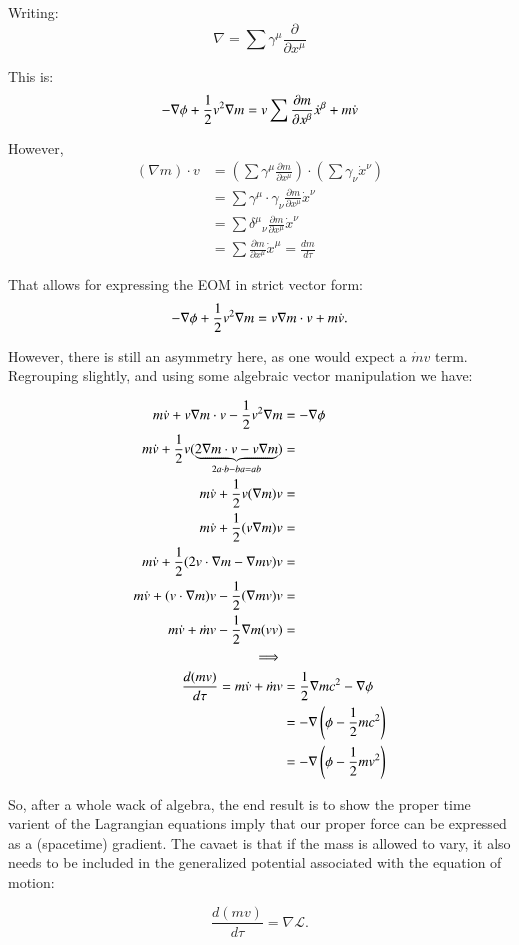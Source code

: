 \documentclass{article}      %
\newcommand{\LL}[0]{\mathcal{L}}
\newcommand{\grad}[0]{\nabla}
\newcommand{\PD}[2]{\frac{\partial {#2}}{\partial {#1}}}
\newcommand{\xdot}[0]{\dot{x}}
\newcommand{\vdot}[0]{\dot{v}}
\newcommand{\mdot}[0]{\dot{m}}
\begin{document}
Writing:
\begin{equation*}
\nabla = \sum \gamma^{\mu} \frac{\partial}{\partial x^{\mu}}
\end{equation*}

This is:
\begin{equation*}
- \grad \phi + \inv{2} v^2 \grad m = v \sum \PD{x^{\beta}}{m} \xdot^{\beta} + m \vdot 
\end{equation*}

However, 
\begin{align*}
(\grad m) \cdot v 
&= 
\left(\sum \gamma^{\mu} \PD{x^{\mu}}{m}\right) \cdot \left( \sum \gamma_{\nu} \xdot^{\nu} \right) \\
&= \sum \gamma^{\mu} \cdot \gamma_{\nu} \PD{x^{\mu}}{m} \xdot^{\nu} \\
&= \sum {\delta^{\mu}}_{\nu} \PD{x^{\mu}}{m} \xdot^{\nu} \\
&= \sum \PD{x^{\mu}}{m} \xdot^{\mu} = \frac{dm}{d\tau}
\end{align*}

That allows for expressing the EOM in strict vector form:
\begin{equation*}
- \grad \phi + \inv{2} v^2 \grad m = v \grad m \cdot v + m \vdot.
\end{equation*}

However, there is still an asymmetry here, as one would expect a $\mdot v$ term.  Regrouping slightly, and using some algebraic vector
manipulation we have:

\begin{align*}
m \vdot + v \grad m \cdot v - \inv{2} v^2 \grad m &= - \grad \phi \\
m \vdot + \inv{2} v ( \underbrace{2 \grad m \cdot v - v \grad m}_{2 a \cdot b - b a = a b}) &= \\
m \vdot + \inv{2} v (\grad m) v &= \\
m \vdot + \inv{2} (v \grad m) v &= \\
m \vdot + \inv{2} (2 v \cdot \grad m - \grad m v) v &= \\
m \vdot + (v \cdot \grad m) v - \inv{2} (\grad m v) v &= \\
m \vdot + \mdot v - \inv{2} \grad m (v v) &= \\
\implies \\
\frac{d (m v)}{d\tau} = m \vdot + \mdot v
&= \inv{2} \grad m c^2 -\grad \phi \\
&= -\grad \left(\phi - \inv{2} m c^2 \right) \\
&= -\grad \left(\phi - \inv{2} m v^2 \right) \\
\end{align*}

So, after a whole wack of algebra, the end result is to show the proper time varient of the Lagrangian equations imply that our 
proper force can be expressed as a (spacetime) gradient.  The cavaet is that if the mass is allowed to vary, it also needs to be
included in the generalized potential associated with the equation of motion:

\begin{equation*}
\frac{d (m v)}{d\tau} = \grad \LL.
\end{equation*}
\end{document}
